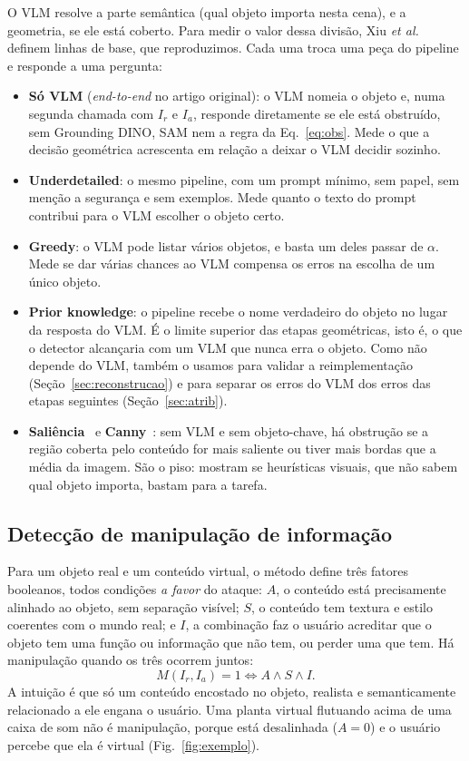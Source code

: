\documentclass[conference]{IEEEtran}
\newcommand{\Ir}{I_r}
\newcommand{\Ia}{I_a}
\begin{document}
O VLM resolve a parte semântica (qual objeto importa nesta cena), e a geometria, se ele está coberto.
Para medir o valor dessa divisão, Xiu \emph{et al.} definem linhas de base, que reproduzimos.
Cada uma troca uma peça do pipeline e responde a uma pergunta:
\begin{itemize}
\item \textbf{Só VLM} (\emph{end-to-end} no artigo original): o VLM nomeia o objeto e, numa segunda
  chamada com $\Ir$ e $\Ia$, responde diretamente se ele está obstruído, sem Grounding DINO, SAM nem a
  regra da Eq.~\eqref{eq:obs}. Mede o que a decisão geométrica acrescenta em relação a deixar o VLM
  decidir sozinho.
\item \textbf{Underdetailed}: o mesmo pipeline, com um prompt mínimo, sem papel, sem menção a segurança e
  sem exemplos. Mede quanto o texto do prompt contribui para o VLM escolher o objeto certo.
\item \textbf{Greedy}: o VLM pode listar vários objetos, e basta um deles passar de $\alpha$. Mede se dar
  várias chances ao VLM compensa os erros na escolha de um único objeto.
\item \textbf{Prior knowledge}: o pipeline recebe o nome verdadeiro do objeto no lugar da resposta do VLM.
  É o limite superior das etapas geométricas, isto é, o que o detector alcançaria com um VLM que nunca
  erra o objeto. Como não depende do VLM, também o usamos para validar a reimplementação
  (Seção~\ref{sec:reconstrucao}) e para separar os erros do VLM dos erros das etapas seguintes
  (Seção~\ref{sec:atrib}).
\item \textbf{Saliência}~\cite{hou2007} e \textbf{Canny}~\cite{canny}: sem VLM e sem objeto-chave, há
  obstrução se a região coberta pelo conteúdo for mais saliente ou tiver mais bordas que a média da
  imagem. São o piso: mostram se heurísticas visuais, que não sabem qual objeto importa, bastam para a
  tarefa.
\end{itemize}

\subsection{Detecção de manipulação de informação}
\label{sec:viddar-man}
Para um objeto real e um conteúdo virtual, o método define três fatores booleanos, todos condições
\emph{a favor} do ataque: \textbf{$A$}, o conteúdo está precisamente alinhado ao objeto, sem separação
visível; \textbf{$S$}, o conteúdo tem textura e estilo coerentes com o mundo real; e \textbf{$I$}, a
combinação faz o usuário acreditar que o objeto tem uma função ou informação que não tem, ou perder uma
que tem. Há manipulação quando os três ocorrem juntos:
\begin{equation}
M(\Ir,\Ia)=1 \iff A \wedge S \wedge I .
\label{eq:man}
\end{equation}
A intuição é que só um conteúdo encostado no objeto, realista e semanticamente relacionado a ele engana o
usuário. Uma planta virtual flutuando acima de uma caixa de som não é manipulação, porque está
desalinhada ($A=0$) e o usuário percebe que ela é virtual (Fig.~\ref{fig:exemplo}).
\end{document}
